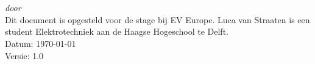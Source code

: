 \begin{titlepage}
    \vspace*{5cm}
    \makeatletter
    \begin{center}
        \begin{Huge}
            \@title
        \end{Huge}\\[0.1cm]
        \begin{Large}
            \@subtitle
        \end{Large}\\
        \emph{door}\\
        \@author
        \vfill
        Dit document is opgesteld voor de stage bij EV Europe. Luca van
        Straaten is een student Elektrotechniek aan de Haagse Hogeschool te
        Delft.\\
        \vspace{.5cm}
        Datum: \today\\
        Versie: 1.0
    \end{center}
    \makeatother
\end{titlepage}

\newpage
